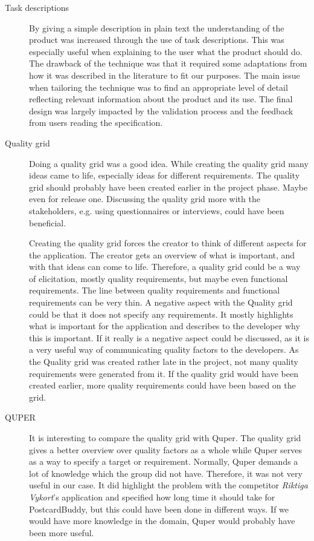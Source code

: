 \documentclass[10pt,a4paper]{article}
\begin{document}
\begin{description}
\item[Task descriptions] By giving a simple description in plain text the understanding of the product was increased through the use of task descriptions. This was especially useful when explaining to the user what the product should do. The drawback of the technique was that it required some adaptations from how it was described in the literature to fit our purposes. The main issue when tailoring the technique was to find an appropriate level of detail reflecting relevant information about the product and its use. The final design was largely impacted by the validation process and the feedback from users reading the specification. 

\item[Quality grid]
Doing a quality grid was a good idea. While creating the quality grid many ideas came to life, especially ideas for different requirements.
The quality grid should probably have been created earlier in the project phase. Maybe even for release one. Discussing the quality grid more with the stakeholders, e.g. using questionnaires or interviews, could have been beneficial. 

Creating the quality grid forces the creator to think of different aspects for the application. The creator gets an overview of what is important, and with that ideas can come to life. Therefore, a quality grid could be a way of elicitation, mostly quality requirements, but maybe even functional requirements. The line between quality requirements and functional requirements can be very thin. A negative aspect with the Quality grid could be that it does not specify any requirements. It mostly highlights what is important for the application and describes to the developer why this is important. If it really is a negative aspect could be discussed, as it is a very useful way of communicating quality factors to the developers. As the Quality grid was created rather late in the project, not many quality requirements were generated from it. If the quality grid would have been created earlier, more quality requirements could have been based on the grid. 

\item[QUPER]
It is interesting to compare the quality grid with Quper. The quality grid gives a better overview over quality factors as a whole while Quper serves as a way to specify a target or requirement. Normally, Quper demands a lot of knowledge which the group did not have. Therefore, it was not very useful in our case. It did highlight the problem with the competitor \textit{Riktiga Vykort}'s application and specified how long time it should take for PostcardBuddy, but this could have been done in different ways. If we would have more knowledge in the domain, Quper would probably have been more useful.
\end{description}
\end{document}

